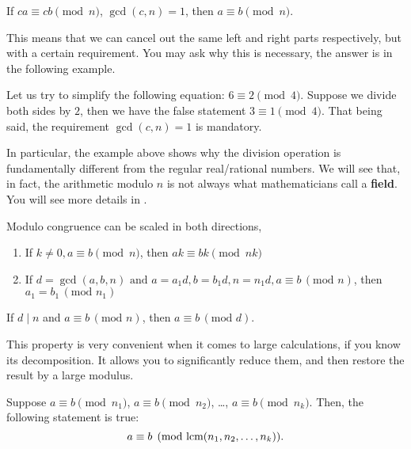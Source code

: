 \documentclass[../lecture-notes-148x210.tex]{subfiles}
\begin{document}
\begin{lemma}
    If $ca \equiv cb \pmod{n}$, $\gcd(c, n) = 1$, then $ a \equiv b \pmod{n}$.
\end{lemma}

This means that we can cancel out the same left and right parts respectively, but with a 
certain requirement. You may ask why this is necessary, the answer is in the following example.

\begin{example}
    Let us try to simplify the following equation: $6 \equiv 2 \pmod{4}$. Suppose we 
    divide both sides by $2$, then we have the false statement $3 \equiv 1 \pmod{4}$. 
    That being said, the requirement $\gcd(c, n) = 1$ is mandatory. 
\end{example}

\begin{remark}
    In particular, the example above shows why the division operation is fundamentally 
    different from the regular real/rational numbers. We will see that, in fact, the 
    arithmetic modulo $n$ is not always what mathematicians call a \textbf{field}. 
    You will see more details in .
\end{remark}

\begin{lemma} \label{lemma:congruence_scale}
    Modulo congruence can be scaled in both directions,
    
    \begin{enumerate}
        \item If $k \neq 0, a \equiv b \pmod{n}$, then $ak \equiv bk \pmod{nk}$
        \item If $d = \gcd(a, b, n) \text{ and } a = a_1d, b =b_1d, n = n_1d, a \equiv b \, (\text{mod } n)$, then $a_1 = b_1 \, (\text{mod } n_1)$
    \end{enumerate}
\end{lemma}

\begin{lemma}
    If $d \mid n$ and $a \equiv b \, (\text{mod } n)$, then $a \equiv b \, (\text{mod } d)$.
\end{lemma}

This property is very convenient when it comes to large calculations, if you know its decomposition.
It allows you to significantly reduce them, and then restore the result by a large modulus.

\begin{lemma}
    Suppose $a \equiv b \pmod{n_1}$, $a \equiv b \pmod{n_2}$, \ldots, $a \equiv b \pmod{n_k}$. Then, the following statement is true: 
    \begin{equation*}
        a \equiv b \pmod{\text{lcm}(n_1, n_2, \dots, n_k)}.
    \end{equation*}
\end{lemma}
\end{document}
